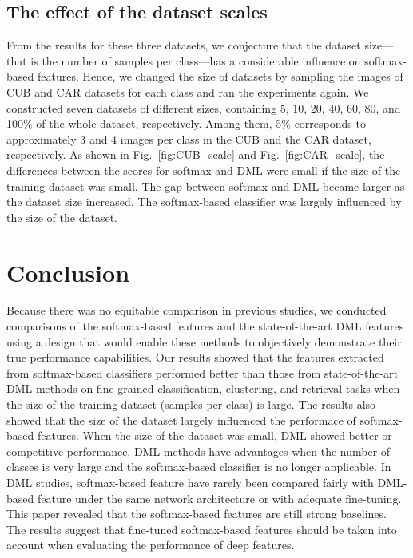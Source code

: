 \documentclass[9pt,technote,compsoc]{./sty/IEEEtran}
\newcommand{\Fref}[1]{Fig.~\ref{#1}}
\begin{document}
\subsection{The effect of the dataset scales}
From the results for these three datasets, we conjecture that the dataset size---that is the number of samples per class---has a considerable influence on softmax-based features.
Hence, we changed the size of datasets by sampling the images of CUB and CAR datasets for each class and ran the experiments again.
We constructed seven datasets of different sizes, containing 5, 10, 20, 40, 60, 80, and 100\% of the whole dataset, respectively.
Among them, 5\% corresponds to approximately 3 and 4 images per class in the CUB and the CAR dataset, respectively.
As shown in \Fref{fig:CUB_scale} and \Fref{fig:CAR_scale}, the differences between the scores for softmax and DML 
were small if the size of the training dataset was small.
The gap between softmax and DML became larger as the dataset size increased.
The softmax-based classifier was largely influenced by the size of the dataset.


\section{Conclusion}
Because there was no equitable comparison in previous studies, we conducted comparisons of the softmax-based features and the state-of-the-art DML features using a design that would enable these methods to objectively demonstrate their true performance capabilities.
Our results showed that the features extracted from softmax-based classifiers performed better than those from state-of-the-art DML methods \cite{song2016deep}\cite{sohn2016improved}\cite{song2017learnable} on fine-grained classification, clustering, and retrieval tasks when the size of the training dataset (samples per class) is large.
The results also showed that the size of the dataset largely influenced the performace of softmax-based features. 
When the size of the dataset was small, DML showed better or competitive performance.
DML methods have advantages when the number of classes is very large and the softmax-based classifier is no longer applicable. 
In DML studies, softmax-based feature have rarely been compared fairly with DML-based feature under the same network architecture or with adequate fine-tuning. This paper revealed that the softmax-based features are still strong baselines. The results suggest that fine-tuned softmax-based features should be taken into account when evaluating the performance of deep features.
\end{document}
